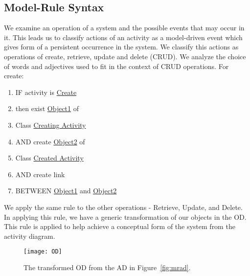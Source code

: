 \documentclass[10pt]{article}
\begin{document}
\subsection{Model-Rule Syntax}
We examine an operation of a system and the possible events that may occur in it. This leads us to classify actions of an activity as a model-driven event which gives form of a persistent occurrence in the system. We classify this actions as operations of create, retrieve, update and delete (CRUD). We analyze the choice of words and adjectives used to fit in the context of CRUD operations.
For create:
\begin{enumerate}
\item IF activity is \underline{Create}
\item then exist \underline{Object1} of
\item Class \underline{Creating Activity}
\item AND create \underline{Object2} of 
\item Class \underline{Created Activity}
\item AND create link 
\item BETWEEN \underline{Object1} and \underline{Object2}
\end{enumerate}
We apply the same rule to the other operations - Retrieve, Update, and Delete. In applying this rule, we have a generic transformation of our objects in the OD. This rule is applied to help achieve a conceptual form of the system from the activity diagram.
\begin{figure}[!ht]
  \centering
   \texttt{[image: OD]}
  \caption{The transformed OD from the AD in Figure~\ref{fig:mrad}.}
  \label{fig:OD}
\end{figure}
\end{document}
